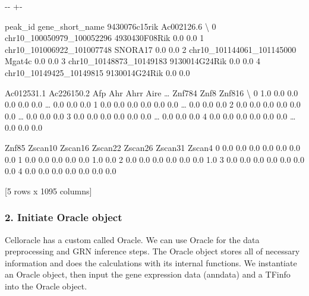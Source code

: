 \documentclass[letterpaper,10pt,english]{sphinxmanual}
\newlength\nbsphinxcodecellspacing
\begin{document}
{

\kern-\sphinxverbatimsmallskipamount\kern-\baselineskip
\kern+\FrameHeightAdjust\kern-\fboxrule
\vspace{\nbsphinxcodecellspacing}

\begin{sphinxVerbatim}[commandchars=\\\{\}]
\llap{\color{nbsphinxout}[11]:\,\hspace{\fboxrule}\hspace{\fboxsep}}                     peak\_id gene\_short\_name  9430076c15rik  Ac002126.6  \textbackslash{}
0  chr10\_100050979\_100052296   4930430F08Rik            0.0         0.0
1  chr10\_101006922\_101007748         SNORA17            0.0         0.0
2  chr10\_101144061\_101145000          Mgat4c            0.0         0.0
3    chr10\_10148873\_10149183   9130014G24Rik            0.0         0.0
4    chr10\_10149425\_10149815   9130014G24Rik            0.0         0.0

   Ac012531.1  Ac226150.2  Afp  Ahr  Ahrr  Aire  {\ldots}  Znf784  Znf8  Znf816  \textbackslash{}
0         1.0         0.0  0.0  0.0   0.0   0.0  {\ldots}     0.0   0.0     0.0
1         0.0         0.0  0.0  0.0   0.0   0.0  {\ldots}     0.0   0.0     0.0
2         0.0         0.0  0.0  0.0   0.0   0.0  {\ldots}     0.0   0.0     0.0
3         0.0         0.0  0.0  0.0   0.0   0.0  {\ldots}     0.0   0.0     0.0
4         0.0         0.0  0.0  0.0   0.0   0.0  {\ldots}     0.0   0.0     0.0

   Znf85  Zscan10  Zscan16  Zscan22  Zscan26  Zscan31  Zscan4
0    0.0      0.0      0.0      0.0      0.0      0.0     0.0
1    0.0      0.0      0.0      0.0      0.0      1.0     0.0
2    0.0      0.0      0.0      0.0      0.0      0.0     1.0
3    0.0      0.0      0.0      0.0      0.0      0.0     0.0
4    0.0      0.0      0.0      0.0      0.0      0.0     0.0

[5 rows x 1095 columns]
\end{sphinxVerbatim}
}


\subsubsection{2. Initiate Oracle object}
\label{\detokenize{notebooks/04_Network_analysis/Network_analysis_with_Paul_etal_2015_data:2.-Initiate-Oracle-object}}
Celloracle has a custom called Oracle. We can use Oracle for the data preprocessing and GRN inference steps. The Oracle object stores all of necessary information and does the calculations with its internal functions. We instantiate an Oracle object, then input the gene expression data (anndata) and a TFinfo into the Oracle object.
\end{document}
